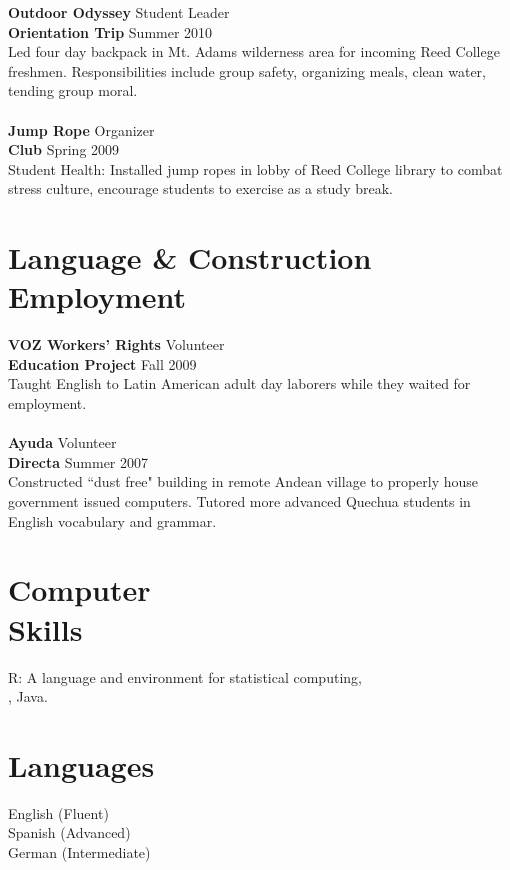 \documentclass[margin,line]{resume}
\begin{document}
\begin{resume}
\textbf{Outdoor Odyssey} \hfill Student Leader \\
\textbf{Orientation Trip} \hfill Summer 2010 \\
Led four day backpack in Mt. Adams wilderness area for incoming Reed College freshmen. Responsibilities include group safety, organizing meals, clean water, tending group moral.
\\\vspace{-2mm}\\
\textbf{Jump Rope} \hfill Organizer
\\\textbf{Club}  \hfill Spring 2009\\
Student Health: Installed jump ropes in lobby of Reed College library to combat stress culture, encourage students to exercise as a study break. 



	\section{\mysidestyle Language \& Construction \\ Employment}
\textbf{VOZ Workers' Rights}  \hfill Volunteer \\ \textbf{Education Project} \hfill Fall 2009 \\ Taught English to Latin American adult day laborers while they waited for employment. \\
\vspace{-2mm}\\    
\textbf{Ayuda} \hfill Volunteer \\    
\textbf{Directa} \hfill Summer 2007	\\
Constructed ``dust free" building in remote Andean village to properly house government issued computers. Tutored more advanced Quechua students in English vocabulary and grammar.    


    \section{\mysidestyle Computer\\Skills}
 R: A language and environment for statistical computing, \\ \LaTeXe,  Java.
    \section{\mysidestyle Languages}
English (Fluent) \\
Spanish (Advanced)\\
German (Intermediate)   %


\end{resume}
\end{document}
